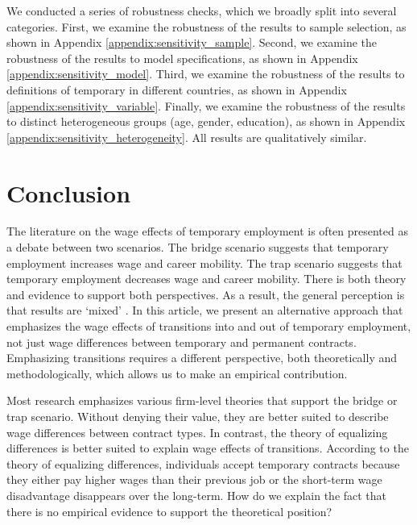 \documentclass[12pt]{article}
\begin{document}
We conducted a series of robustness checks, which we broadly split into several categories.  First, we examine the robustness of the results to sample selection, as shown in Appendix \ref{appendix:sensitivity_sample}.  Second, we examine the robustness of the results to model specifications, as shown in Appendix \ref{appendix:sensitivity_model}.  Third, we examine the robustness of the results to definitions of temporary in different countries, as shown in Appendix \ref{appendix:sensitivity_variable}.  Finally, we examine the robustness of the results to distinct heterogeneous groups (age, gender, education), as shown in Appendix \ref{appendix:sensitivity_heterogeneity}.  All results are qualitatively similar.

\section{Conclusion}

The literature on the wage effects of temporary employment is often presented as a debate between two scenarios.  The bridge scenario suggests that temporary employment increases wage and career mobility.  The trap scenario suggests that temporary employment decreases wage and career mobility.  There is both theory and evidence to support both perspectives.  As a result, the general perception is that results are `mixed' \citep{addison_atypical_2015,mooi-reci_casual_2017,reichenberg_stepping_2019}.  In this article, we present an alternative approach that emphasizes the wage effects of transitions into and out of temporary employment, not just wage differences between temporary and permanent contracts.  Emphasizing transitions requires a different perspective, both theoretically and methodologically, which allows us to make an empirical contribution.  

Most research emphasizes various firm-level theories that support the bridge or trap scenario.  Without denying their value, they are better suited to describe wage differences between contract types.  In contrast, the theory of equalizing differences is better suited to explain wage effects of transitions.  According to the theory of equalizing differences, individuals accept temporary contracts because they either pay higher wages than their previous job or the short-term wage disadvantage disappears over the long-term.  How do we explain the fact that there is no empirical evidence to support the theoretical position?  
\end{document}
